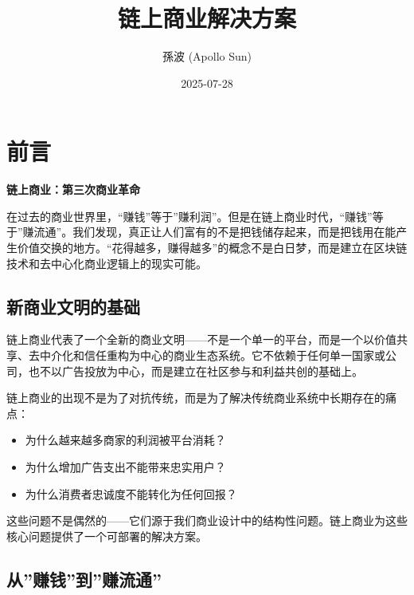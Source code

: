 \documentclass[
  Letterpaper,
]{scrbook}
\title{链上商业解决方案}
\author{孫波 (Apollo Sun)}
\date{2025-07-28}
\providecommand{\tightlist}{%
  \setlength{\itemsep}{0pt}\setlength{\parskip}{0pt}}
\renewcommand*\contentsname{Table of contents}
\newcommand\contentsname{Table of contents}
\begin{document}
\frontmatter
\maketitle

\renewcommand*\contentsname{Table of contents}
{
\setcounter{tocdepth}{1}
\tableofcontents
}

\mainmatter
{}

\chapter*{前言}\label{ux524dux8a00}


\textbf{链上商业：第三次商业革命}

在过去的商业世界里，``赚钱''等于''赚利润''。但是在链上商业时代，``赚钱''等于''赚流通''。我们发现，真正让人们富有的不是把钱储存起来，而是把钱用在能产生价值交换的地方。``花得越多，赚得越多''的概念不是白日梦，而是建立在区块链技术和去中心化商业逻辑上的现实可能。

\section*{新商业文明的基础}\label{ux65b0ux5546ux4e1aux6587ux660eux7684ux57faux7840}


链上商业代表了一个全新的商业文明------不是一个单一的平台，而是一个以价值共享、去中介化和信任重构为中心的商业生态系统。它不依赖于任何单一国家或公司，也不以广告投放为中心，而是建立在社区参与和利益共创的基础上。

链上商业的出现不是为了对抗传统，而是为了解决传统商业系统中长期存在的痛点：

\begin{itemize}
\tightlist
\item
  为什么越来越多商家的利润被平台消耗？
\item
  为什么增加广告支出不能带来忠实用户？
\item
  为什么消费者忠诚度不能转化为任何回报？
\end{itemize}

这些问题不是偶然的------它们源于我们商业设计中的结构性问题。链上商业为这些核心问题提供了一个可部署的解决方案。

\section*{从''赚钱''到''赚流通''}\label{ux4eceux8d5aux94b1ux5230ux8d5aux6d41ux901a}
\end{document}
